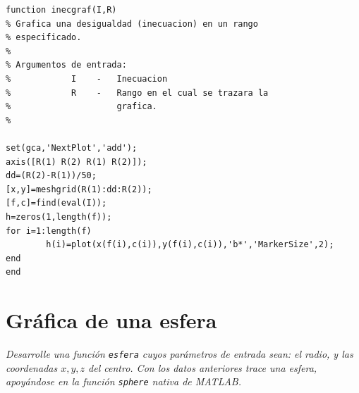\sol

\begin{verbatim}
function inecgraf(I,R)
% Grafica una desigualdad (inecuacion) en un rango
% especificado.
%
% Argumentos de entrada:
%            I    -   Inecuacion
%            R    -   Rango en el cual se trazara la
%                     grafica.
%

set(gca,'NextPlot','add'); 
axis([R(1) R(2) R(1) R(2)]);
dd=(R(2)-R(1))/50;
[x,y]=meshgrid(R(1):dd:R(2));
[f,c]=find(eval(I));
h=zeros(1,length(f));
for i=1:length(f)
        h(i)=plot(x(f(i),c(i)),y(f(i),c(i)),'b*','MarkerSize',2);
end
end
\end{verbatim}

\section{Gráfica de una esfera}

\textit{Desarrolle una función \texttt{esfera} cuyos parámetros de entrada sean: el radio, y las coordenadas $x,y,z$ 
del centro. Con los datos anteriores trace una esfera, apoyándose en la función \texttt{sphere} nativa de MATLAB.}

\sol

